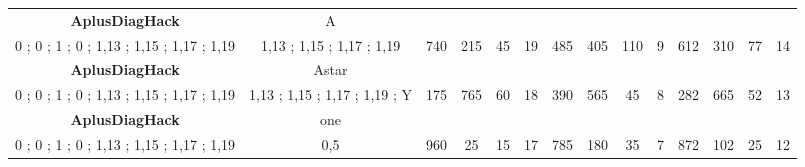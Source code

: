 \begin{table}[]
{\begin{tabular}{|c|c|c|c|c|c|c|c|c|c|c|c|c|c|}
\cellcolor{blue!15}\textbf{AplusDiagHack} & A& {\color[HTML]{00009B} } & {\color[HTML]{9A0000} } & {\color[HTML]{009901} } &  & {\color[HTML]{00009B} } & {\color[HTML]{9A0000} } & {\color[HTML]{009901} } &  & {\color[HTML]{00009B} } & {\color[HTML]{9A0000} } & {\color[HTML]{009901} } &  \\ 
\cellcolor{ blue!15}0 ; 0 ; 1 ; 0 ; 1,13 ; 1,15 ; 1,17 ; 1,19 & 1,13 ; 1,15 ; 1,17 ; 1,19 & \multirow{-2}{*}{{\color[HTML]{00009B} 740}} & \multirow{-2}{*}{{\color[HTML]{9A0000} 215}} & \multirow{-2}{*}{{\color[HTML]{009901} 45}} & \multirow{-2}{*}{19} & \multirow{-2}{*}{{\color[HTML]{00009B} 485}} & \multirow{-2}{*}{{\color[HTML]{9A0000} 405}} & \multirow{-2}{*}{{\color[HTML]{009901} 110}} & \multirow{-2}{*}{9} & \multirow{-2}{*}{{\color[HTML]{00009B} 612}} & \multirow{-2}{*}{{\color[HTML]{9A0000} 310}} & \multirow{-2}{*}{{\color[HTML]{009901} 77}} & \multirow{-2}{*}{14} \\ \hline

\cellcolor{blue!15}\textbf{AplusDiagHack} & Astar& {\color[HTML]{00009B} } & {\color[HTML]{9A0000} } & {\color[HTML]{009901} } &  & {\color[HTML]{00009B} } & {\color[HTML]{9A0000} } & {\color[HTML]{009901} } &  & {\color[HTML]{00009B} } & {\color[HTML]{9A0000} } & {\color[HTML]{009901} } &  \\ 
\cellcolor{ blue!15}0 ; 0 ; 1 ; 0 ; 1,13 ; 1,15 ; 1,17 ; 1,19 & 1,13 ; 1,15 ; 1,17 ; 1,19 ; Y & \multirow{-2}{*}{{\color[HTML]{00009B} 175}} & \multirow{-2}{*}{{\color[HTML]{9A0000} 765}} & \multirow{-2}{*}{{\color[HTML]{009901} 60}} & \multirow{-2}{*}{18} & \multirow{-2}{*}{{\color[HTML]{00009B} 390}} & \multirow{-2}{*}{{\color[HTML]{9A0000} 565}} & \multirow{-2}{*}{{\color[HTML]{009901} 45}} & \multirow{-2}{*}{8} & \multirow{-2}{*}{{\color[HTML]{00009B} 282}} & \multirow{-2}{*}{{\color[HTML]{9A0000} 665}} & \multirow{-2}{*}{{\color[HTML]{009901} 52}} & \multirow{-2}{*}{13} \\ \hline

\cellcolor{blue!15}\textbf{AplusDiagHack} & one& {\color[HTML]{00009B} } & {\color[HTML]{9A0000} } & {\color[HTML]{009901} } &  & {\color[HTML]{00009B} } & {\color[HTML]{9A0000} } & {\color[HTML]{009901} } &  & {\color[HTML]{00009B} } & {\color[HTML]{9A0000} } & {\color[HTML]{009901} } &  \\ 
\cellcolor{ blue!15}0 ; 0 ; 1 ; 0 ; 1,13 ; 1,15 ; 1,17 ; 1,19 & 0,5 & \multirow{-2}{*}{{\color[HTML]{00009B} 960}} & \multirow{-2}{*}{{\color[HTML]{9A0000} 25}} & \multirow{-2}{*}{{\color[HTML]{009901} 15}} & \multirow{-2}{*}{17} & \multirow{-2}{*}{{\color[HTML]{00009B} 785}} & \multirow{-2}{*}{{\color[HTML]{9A0000} 180}} & \multirow{-2}{*}{{\color[HTML]{009901} 35}} & \multirow{-2}{*}{7} & \multirow{-2}{*}{{\color[HTML]{00009B} 872}} & \multirow{-2}{*}{{\color[HTML]{9A0000} 102}} & \multirow{-2}{*}{{\color[HTML]{009901} 25}} & \multirow{-2}{*}{12} \\ \hline


\end{tabular}}
\end{table}

